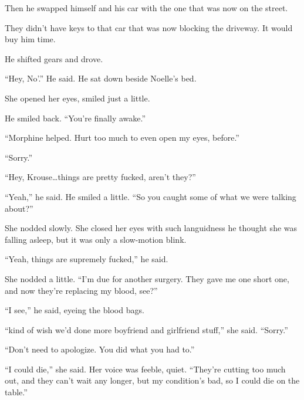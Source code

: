 Then he swapped himself and his car with the one that was now on the street.



They didn't have keys to that car that was now blocking the driveway.  It would buy him time.



He shifted gears and drove.



\sectionbreak



``Hey, No'.'' He said.  He sat down beside Noelle's bed.



She opened her eyes, smiled just a little.



He smiled back.  ``You're finally awake.''



``Morphine helped.  Hurt too much to even open my eyes, before.''



``Sorry.''



``Hey, Krouse\ldots things are pretty fucked, aren't they?''



``Yeah,'' he said.  He smiled a little.  ``So you caught some of what we were talking about?''



She nodded slowly.  She closed her eyes with such languidness he thought she was falling asleep, but it was only a slow-motion blink.



``Yeah, things are supremely fucked,'' he said.



She nodded a little.  ``I'm due for another surgery.  They gave me one short one, and now they're replacing my blood, see?''



``I see,'' he said, eyeing the blood bags.



``\ldotsI kind of wish we'd done more boyfriend and girlfriend stuff,'' she said.  ``Sorry.''



``Don't need to apologize.  You did what you had to.''



``I could die,'' she said.  Her voice was feeble, quiet.  ``They're cutting too much out, and they can't wait any longer, but my condition's bad, so I could die on the table.''




